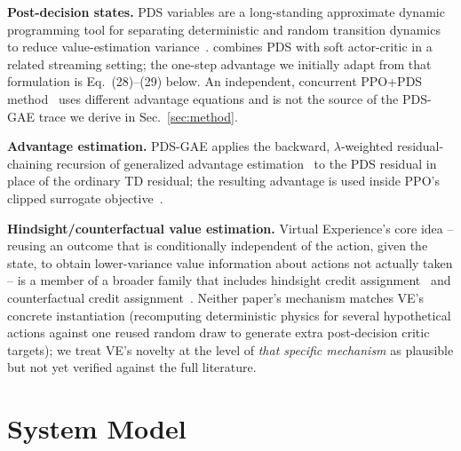 \documentclass[conference]{IEEEtran}
\begin{document}
\textbf{Post-decision states.} PDS variables are a long-standing approximate dynamic
programming tool for separating deterministic and random transition dynamics to
reduce value-estimation variance~\cite{powell_adp}. \cite{ref_ehs} combines PDS with
soft actor-critic in a related streaming setting; the one-step advantage we initially
adapt from that formulation is Eq.~(28)--(29) below. An independent, concurrent PPO+PDS
method~\cite{felizardo2025pds} uses different advantage equations and is not the
source of the PDS-GAE trace we derive in Sec.~\ref{sec:method}.

\textbf{Advantage estimation.} PDS-GAE applies the backward, $\lambda$-weighted
residual-chaining recursion of generalized advantage estimation~\cite{schulman2016gae}
to the PDS residual in place of the ordinary TD residual; the resulting advantage is
used inside PPO's clipped surrogate objective~\cite{schulman2017ppo}.

\textbf{Hindsight/counterfactual value estimation.} Virtual Experience's core idea --
reusing an outcome that is conditionally independent of the action, given the state,
to obtain lower-variance value information about actions not actually taken -- is a
member of a broader family that includes hindsight credit assignment~\cite{hca_harutyunyan}
and counterfactual credit assignment~\cite{mesnard2021cca}. Neither paper's mechanism
matches VE's concrete instantiation (recomputing deterministic physics for several
hypothetical actions against one reused random draw to generate extra post-decision
critic targets); we treat VE's novelty at the level of \emph{that specific mechanism}
as plausible but not yet verified against the full literature.

\section{System Model}
\label{sec:system}
\end{document}
